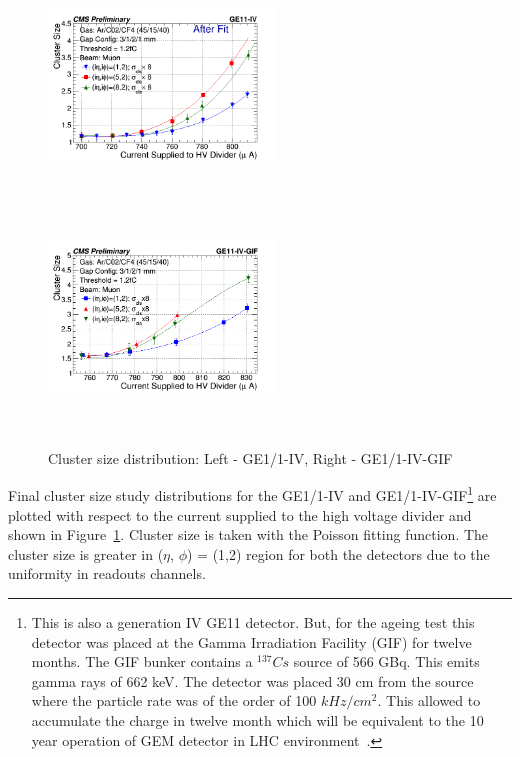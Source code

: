\begin{figure}[!htbp]
   \begin{center}
     \includegraphics[width=6cm,height=6cm]{figures/GEM/CurrentvsClusterSizeAll3EtaPhi.png}%
     \includegraphics[width=6cm,height=6cm]{figures/GEM/CurrentvsClusterSizeAll3EtaPhiGE11IVGIF.png}
   \end{center}
   \caption{Cluster size distribution: Left - GE1/1-IV, Right - GE1/1-IV-GIF}
   \label{fig:CSDGE1/1}
\end{figure}
Final cluster size study distributions for the GE1/1-IV and GE1/1-IV-GIF\footnote{This is also a generation IV GE11 detector. But, for the ageing test this detector was placed at the Gamma Irradiation Facility (GIF) for twelve months. The GIF bunker contains a $^{137}Cs$ source of 566 GBq. This emits gamma rays of 662 keV. The detector was placed 30 cm from the source where the particle rate was of the order of 100 $kHz/cm^2$. This allowed to accumulate the charge in twelve month which will be equivalent to the 10 year operation of GEM detector in LHC environment~\cite{Merlin2013}.} are plotted with respect to the current supplied to the high voltage divider and shown in Figure~\ref{fig:CSDGE1/1}.
Cluster size is taken with the Poisson fitting function. The cluster size is greater in ($\eta$, $\phi$) = (1,2) region for both the detectors due to the uniformity in readouts channels.

